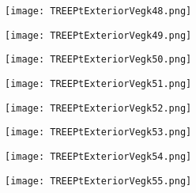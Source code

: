 \documentclass[pdf]{beamer}
\begin{document}
\begin{frame}
\begin{figure}[!h]
\centering
\texttt{[image: TREEPtExteriorVegk48.png]}
\end{figure}
\end{frame}

\begin{frame}
\begin{figure}[!h]
\centering
\texttt{[image: TREEPtExteriorVegk49.png]}
\end{figure}
\end{frame}

\begin{frame}
\begin{figure}[!h]
\centering
\texttt{[image: TREEPtExteriorVegk50.png]}
\end{figure}
\end{frame}

\begin{frame}
\begin{figure}[!h]
\centering
\texttt{[image: TREEPtExteriorVegk51.png]}
\end{figure}
\end{frame}

\begin{frame}
\begin{figure}[!h]
\centering
\texttt{[image: TREEPtExteriorVegk52.png]}
\end{figure}
\end{frame}

\begin{frame}
\begin{figure}[!h]
\centering
\texttt{[image: TREEPtExteriorVegk53.png]}
\end{figure}
\end{frame}

\begin{frame}
\begin{figure}[!h]
\centering
\texttt{[image: TREEPtExteriorVegk54.png]}
\end{figure}
\end{frame}

\begin{frame}
\begin{figure}[!h]
\centering
\texttt{[image: TREEPtExteriorVegk55.png]}
\end{figure}
\end{frame}
\end{document}
